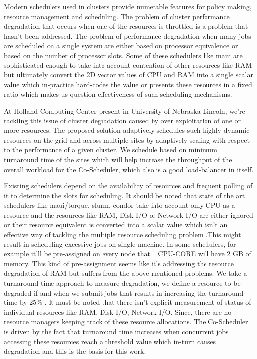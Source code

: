 \documentclass[ms,electronic,double]{nuthesis}
\begin{document}
Modern schedulers used in clusters provide numerable features for policy making, resource management 
and scheduling. The problem of cluster 
performance degradation that occurs when one of the resources is throttled is a problem that hasn't been 
addressed. The problem of performance degradation when many jobs are scheduled on a single system 
are either based on processor equivalence or based on the number of processor slots. Some of 
these schedulers like maui \cite{pbstorque} are sophisticated enough to take into account contention of other 
resources like RAM but ultimately convert the 2D vector values of CPU and RAM 
into a single scalar value which in-practice hard-codes the value or presents these resources
in a fixed ratio which makes us question effectiveness of such scheduling mechanisms. 

At Holland Computing Center present in University of Nebraska-Lincoln, we're 
tackling this issue of cluster degradation caused by 
over exploitation of one or more resources. 
The proposed solution adaptively schedules 
such highly dynamic resources on the grid and across multiple sites by adaptively scaling with respect to
the performance of a given cluster. We schedule based on minimum turnaround time of the sites which will help increase 
the throughput of the overall workload for the Co-Scheduler, which also is a good load-balancer in itself.

Existing schedulers depend on the availability of resources and frequent polling 
of it to determine the slots for scheduling. It should be noted that state of the art 
schedulers like maui/torque, slurm, condor take into account only CPU as a 
resource and the resources like RAM, Disk I/O or Network I/O are either ignored or 
their resource equivalent is converted into a scalar value which isn't an effective way of tackling the 
multiple resource scheduling problem .This might result in scheduling excessive jobs 
on single machine. In some schedulers, for example it'll be pre-assigned on every node that 1 CPU-CORE will have 2 GB of
memory. This kind of pre-assignment seems like it's addressing the resource degradation of RAM but suffers 
from the above mentioned problems.
We take a turnaround time approach to measure degradation, we define a resource 
to be degraded if and when we submit jobs that results in increasing the 
turnaround time by 25\% . It must be 
noted that there isn't explicit measurement of status of individual resources like RAM, Disk I/O, 
Network I/O. Since, there are no resource managers keeping track of these resource allocations. 
The Co-Scheduler is driven by the fact that turnaround time increases when 
concurrent jobs accessing these resources reach a threshold value which in-turn causes 
degradation and this is the basis for this work.
\end{document}
